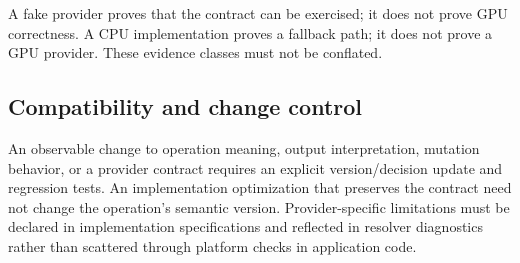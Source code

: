 A fake provider proves that the contract can be exercised; it does not prove GPU correctness. A CPU implementation proves a fallback path; it does not prove a GPU provider. These evidence classes must not be conflated.

\subsection{Compatibility and change control}

An observable change to operation meaning, output interpretation, mutation behavior, or a provider contract requires an explicit version/decision update and regression tests. An implementation optimization that preserves the contract need not change the operation's semantic version. Provider-specific limitations must be declared in implementation specifications and reflected in resolver diagnostics rather than scattered through platform checks in application code.
